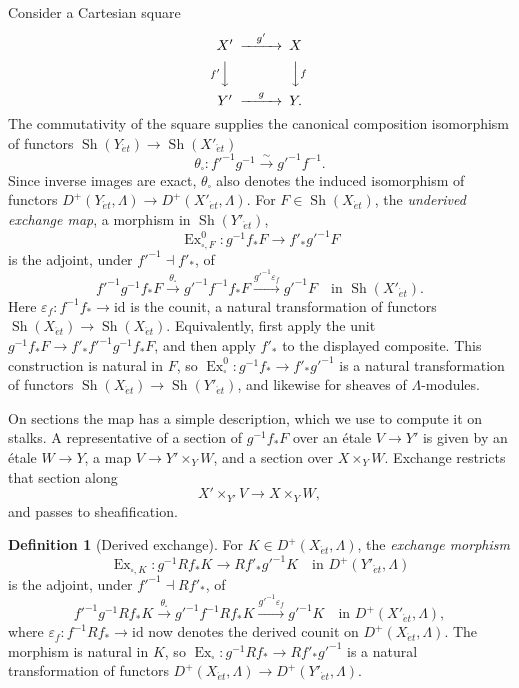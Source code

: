 \documentclass[11pt,a4paper]{article}
\numberwithin{equation}{section}
\theoremstyle{definition}
\newtheorem{definition}[theorem]{Definition}
\theoremstyle{remark}
\newcommand{\D}{D}
\newcommand{\Sh}{\operatorname{Sh}}
\newcommand{\et}{\acute{e}t}
\begin{document}
Consider a Cartesian square
\begin{equation}\label{pbc:square}
\begin{CD}
X' @>{g'}>> X\\
@V{f'}VV @VV{f}V\\
Y' @>{g}>> Y.
\end{CD}
\end{equation}
The commutativity of the square supplies the canonical composition
isomorphism of functors $\Sh(Y_{\et})\to\Sh(X'_{\et})$
\[
 \theta_{\square}:f'^{-1}g^{-1}\xrightarrow{\sim}g'^{-1}f^{-1}.
\]
Since inverse images are exact, $\theta_\square$ also denotes the
induced isomorphism of functors $\D^+(Y_{\et},\Lambda)\to\D^+(X'_{\et},\Lambda)$.
For $F\in\Sh(X_{\et})$, the \emph{underived exchange map}, a morphism in
$\Sh(Y'_{\et})$,
\begin{equation}\label{pbc:underived-exchange}
 \operatorname{Ex}^0_{\square,F}:
 g^{-1}f_*F\longrightarrow f'_*g'^{-1}F
\end{equation}
is the adjoint, under $f'^{-1}\dashv f'_*$, of
\[
 f'^{-1}g^{-1}f_*F
 \xrightarrow{\theta_{\square}}g'^{-1}f^{-1}f_*F
 \xrightarrow{g'^{-1}\varepsilon_f}g'^{-1}F\quad\text{in }\Sh(X'_{\et}).
\]
Here $\varepsilon_f:f^{-1}f_*\to\mathrm{id}$ is the counit, a natural
transformation of functors $\Sh(X_{\et})\to\Sh(X_{\et})$.
Equivalently, first apply the unit
$g^{-1}f_*F\to f'_*f'^{-1}g^{-1}f_*F$, and then apply $f'_*$ to
the displayed composite. This construction is natural in $F$, so
$\operatorname{Ex}^0_\square:g^{-1}f_*\to f'_*g'^{-1}$ is a natural
transformation of functors $\Sh(X_{\et})\to\Sh(Y'_{\et})$, and
likewise for sheaves of $\Lambda$-modules.

On sections the map has a simple description, which we use to compute
it on stalks. A representative of a section of $g^{-1}f_*F$ over an
\'etale $V\to Y'$ is given by an \'etale $W\to Y$, a map $V\to
Y'\times_YW$, and a section over $X\times_YW$. Exchange restricts that
section along
\[
 X'\times_{Y'}V\longrightarrow X\times_YW,
\]
and passes to sheafification.

\begin{definition}[Derived exchange]\label{pbc:exchange}
For $K\in\D^+(X_{\et},\Lambda)$, the \emph{exchange morphism}
\begin{equation}\label{pbc:derived-exchange}
 \operatorname{Ex}_{\square,K}:
 g^{-1}Rf_*K\longrightarrow Rf'_*g'^{-1}K\quad\text{in }\D^+(Y'_{\et},\Lambda)
\end{equation}
is the adjoint, under $f'^{-1}\dashv Rf'_*$, of
\[
 f'^{-1}g^{-1}Rf_*K
 \xrightarrow{\theta_{\square}}g'^{-1}f^{-1}Rf_*K
 \xrightarrow{g'^{-1}\varepsilon_f}g'^{-1}K\quad\text{in }\D^+(X'_{\et},\Lambda),
\]
where $\varepsilon_f:f^{-1}Rf_*\to\mathrm{id}$ now denotes the derived
counit on $\D^+(X_{\et},\Lambda)$. The morphism is natural in $K$, so
$\operatorname{Ex}_\square:g^{-1}Rf_*\to Rf'_*g'^{-1}$ is a natural
transformation of functors $\D^+(X_{\et},\Lambda)\to\D^+(Y'_{\et},\Lambda)$.
\end{definition}
\end{document}
